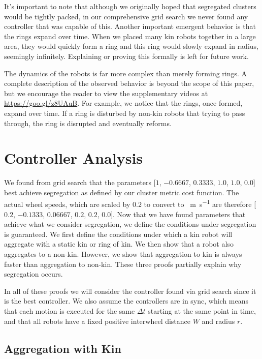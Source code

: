 \documentclass[conference]{IEEEtran}
\begin{document}
    It's important to note that although we originally hoped that segregated clusters would be tightly packed, in our comprehensive grid search we never found any controller that was capable of this. Another important emergent behavior is that the rings expand over time. When we placed many kin robots together in a large area, they would quickly form a ring and this ring would slowly expand in radius, seemingly infinitely. Explaining or proving this formally is left for future work.

    The dynamics of the robots is far more complex than merely forming rings. A complete description of the observed behavior is beyond the scope of this paper, but we encourage the reader to view the supplementary videos at \href{https://www.youtube.com/playlist?list=PL9HqYJ1IkIKVX9EsT5BY9LnBsBPTjc5bB}{https://goo.gl/z8UAuB}. For example, we notice that the rings, once formed, expand over time. If a ring is disturbed by non-kin robots that trying to pass through, the ring is disrupted and eventually reforms.

\section{Controller Analysis}

  We found from grid search that the parameters [$1$, $-0.6667$, $0.3333$, $1.0$, $1.0$, $0.0$] best achieve segregation as defined by our cluster metric cost function. The actual wheel speeds, which are scaled by $0.2$ to convert to \SI{}{\meter\per\second} are therefore [$0.2$, $-0.1333$, $0.06667$, $0.2$, $0.2$, $0.0$]. Now that we have found parameters that achieve what we consider segregation, we define the conditions under segregation is guaranteed. We first define the conditions under which a kin robot will aggregate with a static kin or ring of kin. We then show that a robot also aggregates to a non-kin. However, we show that aggregation to kin is always faster than aggregation to non-kin. These three proofs partially explain why segregation occurs.

  In all of these proofs we will consider the controller found via grid search since it is the best controller. We also assume the controllers are in sync, which means that each motion is executed for the same $\Delta t$ starting at the same point in time, and that all robots have a fixed positive interwheel distance $W$ and radius $r$.

  \subsection{Aggregation with Kin}
\end{document}
